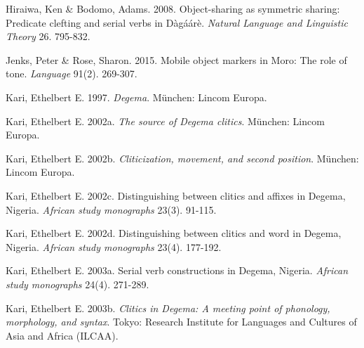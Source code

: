 \documentclass[output=paper]{langsci/langscibook}
\begin{document}
\begin{styleNoSpacing}
Hiraiwa, Ken \& Bodomo, Adams. 2008. Object-sharing as symmetric sharing: Predicate clefting and serial verbs in Dàgáárè. \textit{Natural Language and Linguistic Theory} 26. 795-832.
\end{styleNoSpacing}

\begin{styleNoSpacing}
Jenks, Peter \& Rose, Sharon. 2015. Mobile object markers in Moro: The role of tone. \textit{Language} 91(2). 269-307.
\end{styleNoSpacing}

\begin{styleNoSpacing}
Kari, Ethelbert E. 1997. \textit{Degema}. München: Lincom Europa.
\end{styleNoSpacing}

\begin{styleNoSpacing}
Kari, Ethelbert E. 2002a. \textit{The source of Degema clitics}. München: Lincom Europa.
\end{styleNoSpacing}

\begin{styleNoSpacing}
Kari, Ethelbert E. 2002b. \textit{Cliticization, movement, and second position}. München: Lincom Europa. 
\end{styleNoSpacing}

\begin{styleNoSpacing}
Kari, Ethelbert E. 2002c. Distinguishing between clitics and affixes in Degema, Nigeria. \textit{African study monographs} 23(3). 91-115. 
\end{styleNoSpacing}

\begin{styleNoSpacing}
Kari, Ethelbert E. 2002d. Distinguishing between clitics and word in Degema, Nigeria. \textit{African study monographs} 23(4). 177-192.
\end{styleNoSpacing}

\begin{styleNoSpacing}
Kari, Ethelbert E. 2003a. Serial verb constructions in Degema, Nigeria. \textit{African study monographs} 24(4). 271-289.
\end{styleNoSpacing}

\begin{styleNoSpacing}
Kari, Ethelbert E. 2003b. \textit{Clitics in Degema: A meeting point of phonology, morphology, and syntax}. Tokyo: Research Institute for Languages and Cultures of Asia and Africa (ILCAA).
\end{styleNoSpacing}
\end{document}
